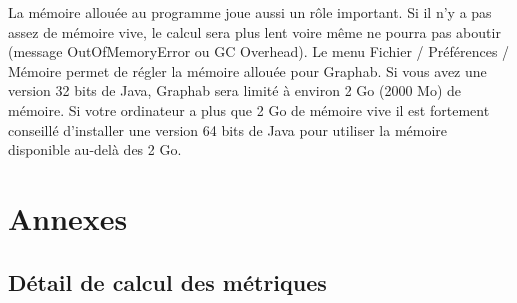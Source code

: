 \documentclass{article}
\begin{document}
La mémoire allouée au programme joue aussi un rôle important. Si il n’y a pas assez de mémoire vive, le calcul sera plus lent voire même ne pourra pas aboutir (message OutOfMemoryError ou GC Overhead). Le menu Fichier / Préférences / Mémoire permet de régler la mémoire allouée pour Graphab. Si vous avez une version 32 bits de Java, Graphab sera limité à environ 2 Go (2000 Mo) de mémoire. Si votre ordinateur a plus que 2 Go de mémoire vive il est fortement conseillé d’installer une version 64 bits de Java pour utiliser la mémoire disponible au-delà des 2 Go.


\section{Annexes}

\subsection{Détail de calcul des métriques}
\end{document}
